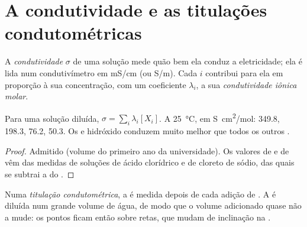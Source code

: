 \section{A condutividade e as titulações condutométricas}

\begin{definition}\label{def:g12:ph-conductivity-titrations:conductivity}
A \emph{condutividade} $\sigma$ de uma solução mede
quão bem ela conduz a eletricidade; ela é lida num condutivímetro em
\si{mS/cm} (ou \si{S/m}). Cada  $i$ contribui para ela em proporção à
sua concentração, com um coeficiente $\lambda_i$, a sua
\emph{condutividade iônica molar}.
\end{definition}

\begin{proposition}\label{prop:g12:ph-conductivity-titrations:kohlrausch}
Para uma solução diluída, $\sigma = \sum_i \lambda_i [X_i]$. A
\qty{25}{\celsius}, em \si{S.cm^2/mol}:  349.8,  198.3,
 76.2,  50.3. Os  e hidróxido conduzem muito
melhor que todos os outros .
\end{proposition}

\begin{proof}
Admitido (volume do primeiro ano da universidade). Os valores de
 e de  vêm das  medidas de soluções de
ácido clorídrico e de cloreto de sódio, das quais se subtrai a do
.
\end{proof}

\begin{definition}\label{def:g12:ph-conductivity-titrations:conductimetric}
Numa \emph{titulação condutométrica}, a
 é medida depois de cada adição de . A  é diluída num grande volume de água, de modo que o volume
adicionado quase não a mude: os pontos ficam então sobre retas, que
mudam de inclinação na .
\end{definition}

